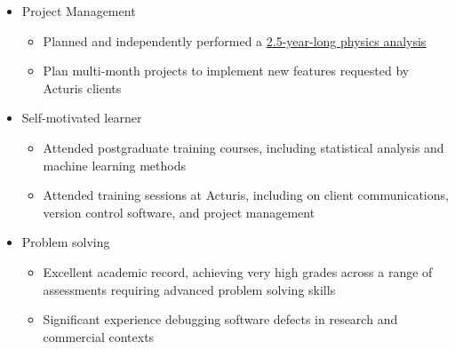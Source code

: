 \documentclass[a4paper]{article}
\newcommand\link[2]{{\color{hl}\uline{\href{#1}{#2}}}}
\newcommand\intersectionspacing{0.3em}
\newcommand\thesislink[1]{https://raw.githubusercontent.com/hacooke/thesis/refs/heads/master/thesis.pdf\#page=#1}
\begin{document}
{\begin{itemize}
\begin{itemize}
          but also block out time to progress projects
      \end{itemize}
      \item Project Management
      \begin{itemize}
        \item Planned and independently performed a
          \link{\thesislink{150}}{2.5-year-long physics analysis}
        \item Plan multi-month projects to implement new features requested by
          Acturis clients
      \end{itemize}
      \item Self-motivated learner
      \begin{itemize}
        \item Attended postgraduate training courses, including
          statistical analysis and machine learning methods
        \item Attended training sessions at Acturis, including
          on client communications, version control software, and project management
      \end{itemize}
      \item Problem solving
      \begin{itemize}
        \item Excellent academic record, achieving very high grades across a
          range of assessments requiring advanced problem solving skills
        \item Significant experience debugging software defects in research
          and commercial contexts
      \end{itemize}
    \end{itemize}
}\\[\intersectionspacing]%
\end{document}
